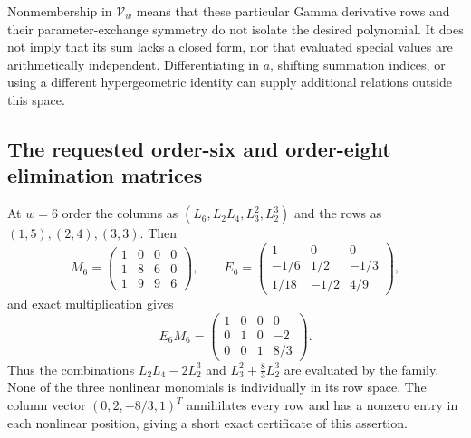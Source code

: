 \begin{remark}
Nonmembership in $\mathcal V_w$ means that these particular Gamma
derivative rows and their parameter-exchange symmetry do not isolate
the desired polynomial. It does not imply that its sum lacks a closed
form, nor that evaluated special values are arithmetically independent.
Differentiating in $a$, shifting summation indices, or using a different
hypergeometric identity can supply additional relations outside this space.
\end{remark}

\subsection{The requested order-six and order-eight elimination matrices}

At $w=6$ order the columns as
$(L_6,L_2L_4,L_3^2,L_2^3)$ and the rows as $(1,5),(2,4),(3,3)$.
Then
\begin{equation}
 M_6=\begin{pmatrix}1&0&0&0\\1&8&6&0\\1&9&9&6\end{pmatrix},\qquad
 E_6=\begin{pmatrix}1&0&0\\-1/6&1/2&-1/3\\1/18&-1/2&4/9\end{pmatrix},
 \label{bell:sixmatrix}
\end{equation}
and exact multiplication gives
\begin{equation}
 E_6M_6=\begin{pmatrix}1&0&0&0\\0&1&0&-2\\0&0&1&8/3\end{pmatrix}.
 \label{bell:sixrref}
\end{equation}
Thus the combinations $L_2L_4-2L_2^3$ and
$L_3^2+\tfrac83L_2^3$ are evaluated by the family. None of the three
nonlinear monomials is individually in its row space. The column vector
$(0,2,-8/3,1)^T$ annihilates every row and has a nonzero entry in
each nonlinear position, giving a short exact certificate of this assertion.

